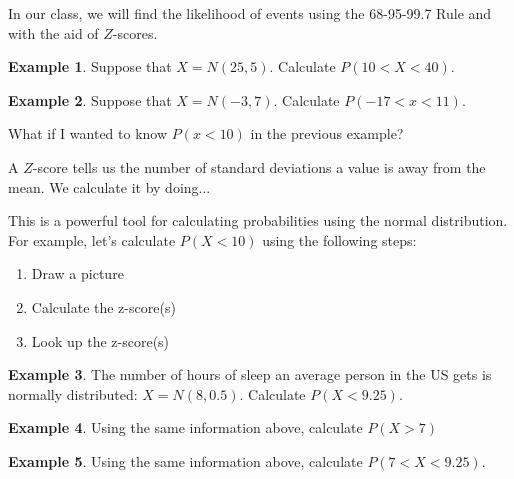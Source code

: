 \documentclass[12pt]{amsart}
\theoremstyle{definition}
\newtheorem{ex}{Example}
\begin{document}
In our class, we will find the likelihood of events using the 68-95-99.7 Rule and with the aid of $Z$-scores.

\newpage
\begin{ex} Suppose that $X=N(25,5)$. Calculate $P(10<X<40)$.\end{ex} \vspace{1in}
\begin{ex} Suppose that $X=N(-3,7)$. Calculate $P(-17<x<11)$.\end{ex} \vspace{1in}

\noindent What if I wanted to know $P(x<10)$ in the previous example?

\vspace{0.5in}

\begin{framed}
	A $Z$-score tells us the number of standard deviations a value is away from the mean. We calculate it by doing...
	\vspace{1in}
\end{framed}

This is a powerful tool for calculating probabilities using the normal distribution. For example, let's calculate $P(X<10)$ using the following steps:
\begin{enumerate}
	\item Draw a picture
	\item Calculate the z-score(s)
	\item Look up the z-score(s)
\end{enumerate}
 	\newpage
 \begin{ex} The number of hours of sleep an average person in the US gets is normally distributed: $X=N(8,0.5)$. Calculate $P(X<9.25)$.\end{ex}\vfill
 	\begin{ex} Using the same information above, calculate $P(X>7)$ \end{ex}\vfill
 	\begin{ex}
 	 Using the same information above, calculate $P(7<X<9.25)$.	
 	\end{ex}\vfill
 
\end{document}
